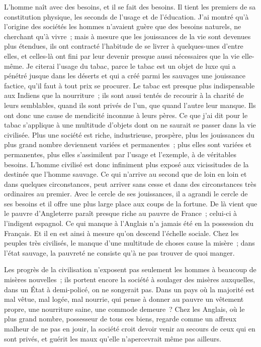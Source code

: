 \documentclass[twoside]{book} %
\begin{document}
\noindent L'homme naît avec des besoins, et il se fait des besoins. Il tient les premiers de sa constitution physique, les seconds de l’usage et de l’éducation. J'ai montré qu’à l’origine des sociétés les hommes n’avaient guère que des besoins naturels, ne cherchant qu’à vivre ; mais à mesure que les jouissances de la vie sont devenues plus étendues, ils ont contracté l’habitude de se livrer à quelques-unes d’entre elles, et celles-là ont fini par leur devenir presque aussi nécessaires que la vie elle-même. Je citerai l’usage du tabac, parce le tabac est un objet de luxe qui a pénétré jusque dans les déserts et qui a créé parmi les sauvages une jouissance factice, qu’il faut à tout prix se procurer. Le tabac est presque plus indispensable aux Indiens que la nourriture ; ils sont aussi tentés de recourir à la charité de leurs semblables, quand ils sont privés de l’un, que quand l’autre leur manque. Ils ont donc une cause de mendicité inconnue à leurs pères. Ce que j’ai dit pour le tabac s’applique à une multitude d’objets dont on ne saurait se passer dans la vie civilisée. Plus une société est riche, industrieuse, prospère, plus les jouissances du plus grand nombre deviennent variées et permanentes ; plus elles sont variées et permanentes, plus elles s’assimilent par l’usage et l’exemple, à de véritables besoins. L'homme civilisé est donc infiniment plus exposé aux vicissitudes de la destinée que l’homme sauvage. Ce qui n’arrive au second que de loin en loin et dans quelques circonstances, peut arriver sans cesse et dans des circonstances très ordinaires au premier. Avec le cercle de ses jouissances, il a agrandi le cercle de ses besoins et il offre une plus large place aux coups de la fortune. De là vient que le pauvre d’Angleterre paraît presque riche au pauvre de France ; celui-ci à l’indigent espagnol. Ce qui manque à l’Anglais n’a jamais été en la possession du Français. Et il en est ainsi à mesure qu’on descend l’échelle sociale. Chez les peuples très civilisés, le manque d’une multitude de choses cause la misère ; dans l’état sauvage, la pauvreté ne consiste qu’à ne pas trouver de quoi manger.\par
Les progrès de la civilisation n’exposent pas seulement les hommes à beaucoup de misères nouvelles ; ils portent encore la société à soulager des misères auxquelles, dans un État à demi-policé, on ne songerait pas. Dans un pays où la majorité est mal vêtue, mal logée, mal nourrie, qui pense à donner au pauvre un vêtement propre, une nourriture saine, une commode demeure ? Chez les Anglais, où le plus grand nombre, possesseur de tous ces biens, regarde comme un affreux malheur de ne pas en jouir, la société croit devoir venir au secours de ceux qui en sont privés, et guérit les maux qu’elle n’apercevrait même pas ailleurs.\par
\end{document}
